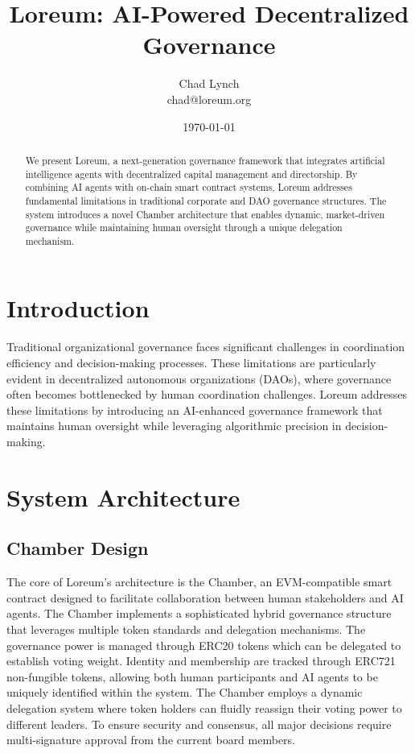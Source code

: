 \documentclass[12pt]{article}
\title{Loreum: AI-Powered Decentralized Governance}
\author{Chad Lynch \\ \small{chad@loreum.org}}
\date{\today}
\begin{document}
\maketitle

\begin{abstract}
We present Loreum, a next-generation governance framework that integrates artificial intelligence agents with decentralized capital management and directorship. By combining AI agents with on-chain smart contract systems, Loreum addresses fundamental limitations in traditional corporate and DAO governance structures. The system introduces a novel Chamber architecture that enables dynamic, market-driven governance while maintaining human oversight through a unique delegation mechanism.
\end{abstract}

\section{Introduction}
Traditional organizational governance faces significant challenges in coordination efficiency and decision-making processes. These limitations are particularly evident in decentralized autonomous organizations (DAOs), where governance often becomes bottlenecked by human coordination challenges. Loreum addresses these limitations by introducing an AI-enhanced governance framework that maintains human oversight while leveraging algorithmic precision in decision-making.

\section{System Architecture}

\subsection{Chamber Design}
The core of Loreum's architecture is the Chamber, an EVM-compatible smart contract designed to facilitate collaboration between human stakeholders and AI agents. The Chamber implements a sophisticated hybrid governance structure that leverages multiple token standards and delegation mechanisms. The governance power is managed through ERC20 tokens which can be delegated to establish voting weight. Identity and membership are tracked through ERC721 non-fungible tokens, allowing both human participants and AI agents to be uniquely identified within the system. The Chamber employs a dynamic delegation system where token holders can fluidly reassign their voting power to different leaders. To ensure security and consensus, all major decisions require multi-signature approval from the current board members.
\end{document}
